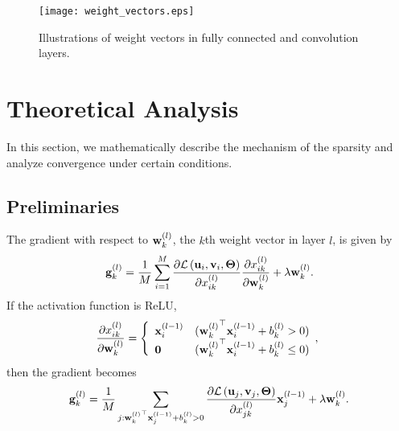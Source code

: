 \documentclass[conference]{IEEEtran}
\begin{document}
\begin{figure}[tb] 
	\centerline{\texttt{[image: weight\_vectors.eps]}}
	\caption{Illustrations of weight vectors in fully connected and convolution layers.}
	\label{fig:weight_vectors}
\end{figure}

\section{Theoretical Analysis}\label{sec:theoretical_analysis}
In this section, we mathematically describe the mechanism of the sparsity and analyze convergence under certain conditions.

\subsection{Preliminaries}\label{subsec:preliminaries}
The gradient with respect to ${\bf w}_k^{\left( l \right)}$, the $k$th weight vector in layer $l$, is given by
\begin{align}{\bf g}_k^{\left( l \right)} 
	= \frac{1}{M} \sum_{i=1}^M
	\frac{\partial {\mathcal L} \left( {\bf u}_i, {\bf v}_i , {\bf \Theta} \right)}
	{\partial x_{ik}^{\left( l\right)}}
	\frac{\partial x_{ik}^{\left( l\right)}}
	{\partial {\bf w}_k^{\left( l \right)}}
	+ \lambda {\bf w}_k^{\left( l \right)}.
\end{align}
If the activation function is ReLU, 
\begin{align}
	\frac{\partial x_{ik}^{\left( l\right)}}
	{\partial {\bf w}_k^{\left( l \right)}}
	=
	\left \{
		\begin{array}{ll}
		{\bf x}_i^{\left( l-1 \right)}	&	({{\bf w}_k^{\left( l \right)}}^\top {\bf x}_i^{\left( l-1 \right)} + b_k^{\left( l \right) } > 0) \\
		{\bf 0}							&	({{\bf w}_k^{\left( l \right)}}^\top {\bf x}_i^{\left( l-1 \right)} + b_k^{\left( l \right) } \leq 0)
		\end{array},
	\right.	
\end{align}
then the gradient becomes
\begin{align}{\bf g}_k^{\left( l \right)} 
	= \frac{1}{M} \sum_{ j:{{\bf w}_k^{\left( l \right)}}^\top {\bf x}_j^{\left( l-1 \right)} + b_k^{\left( l \right) } > 0 }
	\frac{\partial {\mathcal L} \left( {\bf u}_j, {\bf v}_j , {\bf \Theta} \right)}
	{\partial x_{jk}^{\left( l\right)}}
	{\bf x}_j^{\left( l-1 \right)} + \lambda {\bf w}_k^{\left( l \right)}.
\end{align}
\end{document}
